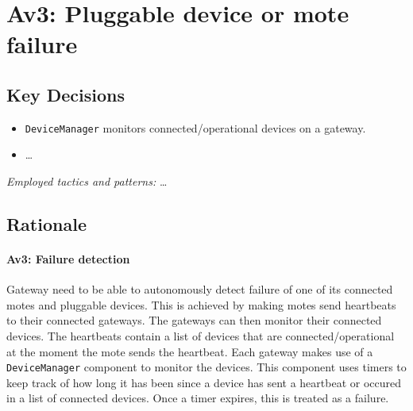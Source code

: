 
\showdecisionsnotes{}

\section{Av3: Pluggable device or mote failure}
    \subsection*{Key Decisions}
    \begin{itemize}
    	\item \texttt{DeviceManager} monitors connected/operational devices on a gateway.
    	\item \ldots
    \end{itemize}
    \emph{Employed tactics and patterns:} \ldots

    \subsection*{Rationale}
        \paragraph{Av3: Failure detection}
            Gateway need to be able to autonomously detect failure of one of its
            connected motes and pluggable devices. This is achieved by making motes
            send heartbeats to their connected gateways. The gateways can
            then monitor their connected devices. The heartbeats contain a list
            of devices that are connected/operational at the moment the mote sends
            the heartbeat. Each gateway makes use of a \texttt{DeviceManager}
            component to monitor the devices. This component uses timers to keep track
            of how long it has been since a device has sent a heartbeat or occured in
            a list of connected devices. Once a timer expires, this is treated as
            a failure. \\

